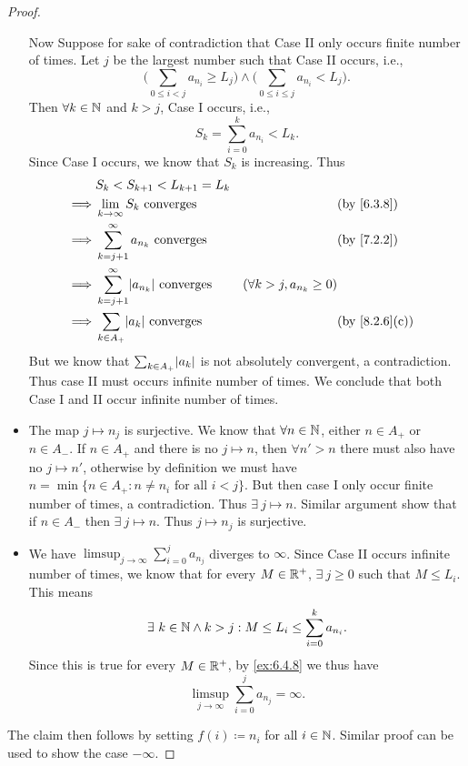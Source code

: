 \begin{proof}
\begin{itemize}
          Now Suppose for sake of contradiction that Case II only occurs finite number of times.
          Let \(j\) be the largest number such that Case II occurs, i.e.,
          \[
            \Bigg(\sum_{0 \leq i < j} a_{n_i} \geq L_j\Bigg) \land \Bigg(\sum_{0 \leq i \leq j} a_{n_i} < L_j\Bigg).
          \]
          Then \(\forall k \in \mathbb{N}\) and \(k > j\), Case I occurs, i.e.,
          \[
            S_k = \sum_{i = 0}^k a_{n_i} < L_k.
          \]
          Since Case I occurs, we know that \(S_k\) is increasing.
          Thus
          \begin{align*}
                     & S_k < S_{k + 1} < L_{k + 1} = L_k                                                                                       \\
            \implies & \lim_{k \to \infty} S_k \text{ converges}               &                                 & \text{(by \cref{6.3.8})}    \\
            \implies & \sum_{k = j + 1}^\infty a_{n_k} \text{ converges}       &                                 & \text{(by \cref{7.2.2})}    \\
            \implies & \sum_{k = j + 1}^\infty \abs{a_{n_k}} \text{ converges} & (\forall k > j, a_{n_k} \geq 0)                               \\
            \implies & \sum_{k \in A_+} \abs{a_k} \text{ converges}            &                                 & \text{(by \cref{8.2.6}(c))}
          \end{align*}
          But we know that \(\sum_{k \in A_+} \abs{a_k}\) is not absolutely convergent, a contradiction.
          Thus case II must occurs infinite number of times.
          We conclude that both Case I and II occur infinite number of times.
    \item The map \(j \mapsto n_j\) is surjective.
          We know that \(\forall n \in \mathbb{N}\), either \(n \in A_+\) or \(n \in A_-\).
          If \(n \in A_+\) and there is no \(j \mapsto n\), then \(\forall n' > n\) there must also have no \(j \mapsto n'\), otherwise by definition we must have \(n = \min\{n \in A_+ : n \neq n_i \text{ for all } i < j\}\).
          But then case I only occur finite number of times, a contradiction.
          Thus \(\exists\ j \mapsto n\).
          Similar argument show that if \(n \in A_-\) then \(\exists\ j \mapsto n\).
          Thus \(j \mapsto n_j\) is surjective.
    \item We have \(\limsup_{j \to \infty} \sum_{i = 0}^j a_{n_j}\) diverges to \(\infty\).
          Since Case II occurs infinite number of times, we know that for every \(M \in \mathbb{R}^+\), \(\exists\ j \geq 0\) such that \(M \leq L_i\).
          This means
          \[
            \exists\ k \in \mathbb{N} \land k > j : M \leq L_i \leq \sum_{i = 0}^k a_{n_i}.
          \]
          Since this is true for every \(M \in \mathbb{R}^+\), by \cref{ex:6.4.8} we thus have
          \[
            \limsup_{j \to \infty} \sum_{i = 0}^j a_{n_j} = \infty.
          \]
  \end{itemize}
  The claim then follows by setting \(f(i) \coloneqq n_i\) for all \(i \in \mathbb{N}\).
  Similar proof can be used to show the case \(-\infty\).
\end{proof}